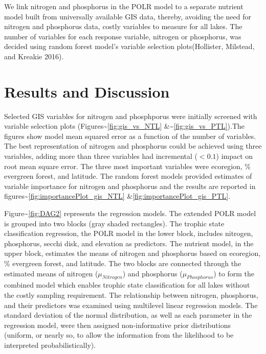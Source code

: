 \documentclass[fleqn,10pt,lineno]{wlpeerj} %
\begin{document}
We link nitrogen and phosphorus in the POLR model to a separate nutrient model built from universally available GIS data, thereby, avoiding the need for nitrogen and phosphorus data, costly variables to measure for all lakes. The number of variables for each response variable, nitrogen or phosphorus, was decided using random forest model's variable selection plots(Hollister, Milstead, and Kreakie 2016).

\hypertarget{results-and-discussion}{%
\section*{Results and Discussion}\label{results-and-discussion}}

Selected GIS variables for nitrogen and phosphporus were initially screened with variable selection plots (Figures\textasciitilde{}\ref{fig:gis_vs_NTL} \&\textasciitilde{}\ref{fig:gis_vs_PTL}).The figures show model mean squared error as a function of the number of variables. The best representation of nitrogen and phosphorus could be achieved using three variables, adding more than three variables had incremental (\(<0.1\)) impact on root mean square error. The three most important variables were ecoregion, \% evergreen forest, and latitude. The random forest models provided estimates of variable importance for nitrogen and phosphorus and the results are reported in figures\textasciitilde{}\ref{fig:importancePlot_gis_NTL} \&\ref{fig:importancePlot_gis_PTL}.

Figure\textasciitilde{}\ref{fig:DAG2} represents the regression models. The extended POLR model is grouped into two blocks (gray shaded rectangles). The trophic state classification regression, the POLR model in the lower block, includes nitrogen, phosphorus, secchi disk, and elevation as predictors. The nutrient model, in the upper block, estimates the means of nitrogen and phosphorus based on ecoregion, \% evergreen forest, and latitude. The two blocks are connected through the estimated means of nitrogen (\(\mu_{Nitrogen}\)) and phosphorus (\(\mu_{Phosphorus}\)) to form the combined model which enables trophic state classification for all lakes without the costly sampling requirement. The relationship between nitrogen, phosphorus, and their predictors was examined using multilevel linear regression models. The standard deviation of the normal distribution, as well as each parameter in the regression model, were then assigned non-informative prior distributions (uniform, or nearly so, to allow the information from the likelihood to be interpreted probabilistically).
\end{document}

